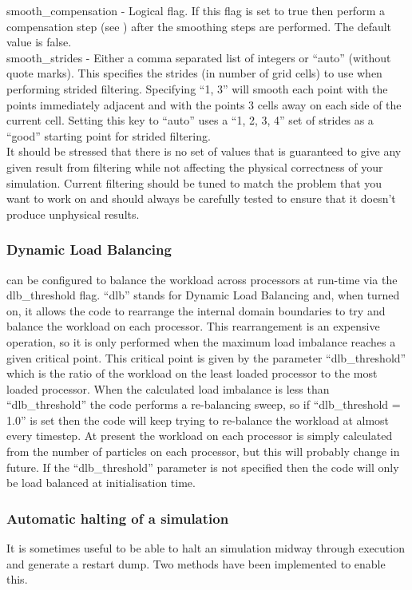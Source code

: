 {\emphtext smooth\_compensation} - Logical flag. If this flag is set to true
  then perform a compensation step (see \citet{Vay2014}) after the smoothing
  steps are performed. The default value is false.\\

{\emphtext smooth\_strides} - Either a comma separated list of integers or
  ``auto'' (without quote marks). This specifies the strides (in number of grid
  cells) to use when performing strided filtering. Specifying ``1, 3'' will
  smooth each point with the points immediately adjacent and with the points
  3 cells away on each side of the current cell. Setting this key to
  ``auto'' uses a ``1, 2, 3, 4'' set of strides as a ``good'' starting point
  for strided filtering.\\

It should be stressed that there is no set of values that is guaranteed to
give any given result from filtering while not affecting the physical
correctness of your simulation. Current filtering should be tuned to match the
problem that you want to work on and should always be carefully tested to
ensure that it doesn't produce unphysical results.


\subsubsection{Dynamic Load Balancing}
{\EPOCH} can be configured to balance the workload across processors at
run-time via the {\emphtext dlb\_threshold} flag.
``dlb'' stands for Dynamic Load Balancing and, when turned on, it allows the
code to rearrange the internal domain boundaries to try and balance the
workload on each processor. This rearrangement is an expensive operation, so
it is only performed when the maximum load imbalance reaches a given critical
point. This critical point is given by the parameter ``dlb\_threshold'' which
is the ratio of the workload on the least loaded processor to the most loaded
processor. When the calculated load imbalance is less than ``dlb\_threshold''
the code performs a re-balancing sweep, so if ``dlb\_threshold = 1.0'' is set
then the code will keep trying to re-balance the workload at almost every
timestep. At present the workload on each processor is simply calculated from
the number of particles on each processor, but this will probably change in
future. If the ``dlb\_threshold'' parameter is not specified then the code
will only be load balanced at initialisation time.


\subsubsection{Automatic halting of a simulation}
It is sometimes useful to be able to halt an {\EPOCH} simulation midway through
execution and generate a restart dump. Two methods have been implemented to
enable this.


